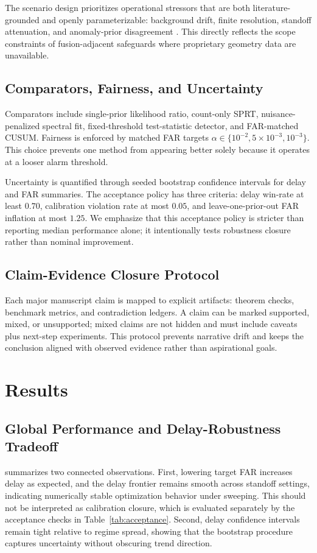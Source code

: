 \documentclass{article} %
\begin{document}
The scenario design prioritizes operational stressors that are both literature-grounded and openly parameterizable: background drift, finite resolution, standoff attenuation, and anomaly-prior disagreement \citep{SRC001,SRC009,SRC014,SRC017,SRC023}. This directly reflects the scope constraints of fusion-adjacent safeguards where proprietary geometry data are unavailable.

\subsection{Comparators, Fairness, and Uncertainty}
Comparators include single-prior likelihood ratio, count-only SPRT, nuisance-penalized spectral fit, fixed-threshold test-statistic detector, and FAR-matched CUSUM. Fairness is enforced by matched FAR targets $\alpha\in\{10^{-2},5\times10^{-3},10^{-3}\}$. This choice prevents one method from appearing better solely because it operates at a looser alarm threshold.

Uncertainty is quantified through seeded bootstrap confidence intervals for delay and FAR summaries. The acceptance policy has three criteria: delay win-rate at least $0.70$, calibration violation rate at most $0.05$, and leave-one-prior-out FAR inflation at most $1.25$. We emphasize that this acceptance policy is stricter than reporting median performance alone; it intentionally tests robustness closure rather than nominal improvement.

\subsection{Claim-Evidence Closure Protocol}
Each major manuscript claim is mapped to explicit artifacts: theorem checks, benchmark metrics, and contradiction ledgers. A claim can be marked supported, mixed, or unsupported; mixed claims are not hidden and must include caveats plus next-step experiments. This protocol prevents narrative drift and keeps the conclusion aligned with observed evidence rather than aspirational goals.

\section{Results}\label{sec:results}
\subsection{Global Performance and Delay-Robustness Tradeoff}
 summarizes two connected observations. First, lowering target FAR increases delay as expected, and the delay frontier remains smooth across standoff settings, indicating numerically stable optimization behavior under sweeping. This should not be interpreted as calibration closure, which is evaluated separately by the acceptance checks in Table~\ref{tab:acceptance}. Second, delay confidence intervals remain tight relative to regime spread, showing that the bootstrap procedure captures uncertainty without obscuring trend direction.
\end{document}
